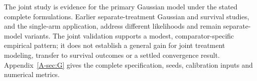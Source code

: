 The joint study is evidence for the primary Gaussian model under the stated complete formulations. Earlier separate-treatment Gaussian and survival studies, and the single-arm application, address different likelihoods and remain separate-model variants. The joint validation supports a modest, comparator-specific empirical pattern; it does not establish a general gain for joint treatment modeling, transfer to survival outcomes or a settled convergence result. Appendix~\ref{A-sec:G} gives the complete specification, seeds, calibration inputs and numerical metrics.
